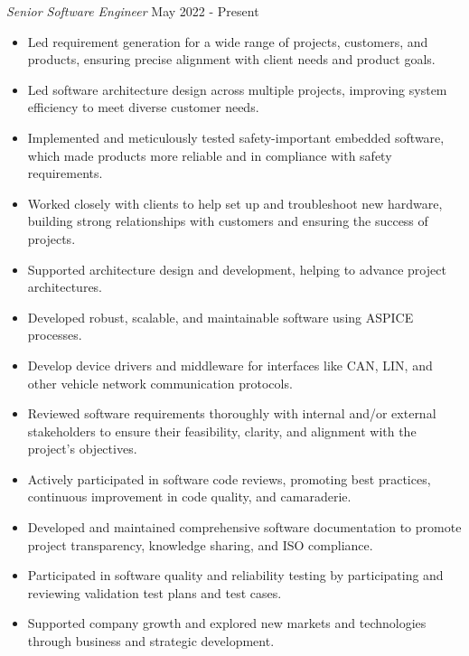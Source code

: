 \noindent
\textit{Senior Software Engineer} \hfill May 2022 - Present \\
\begin{itemize}[leftmargin=*,noitemsep,topsep=3pt]
    \item Led requirement generation for a wide range of projects, customers, and products, ensuring precise alignment with client needs and product goals.
    \item Led software architecture design across multiple projects, improving system efficiency to meet diverse customer needs.
    \item Implemented and meticulously tested safety-important embedded software, which made products more reliable and in compliance with safety requirements.
    \item Worked closely with clients to help set up and troubleshoot new hardware, building strong relationships with customers and ensuring the success of projects.
    \item Supported architecture design and development, helping to advance project architectures.
    \item Developed robust, scalable, and maintainable software using ASPICE processes.
    \item Develop device drivers and middleware for interfaces like CAN, LIN, and other vehicle network communication protocols.
    \item Reviewed software requirements thoroughly with internal and/or external stakeholders to ensure their feasibility, clarity, and alignment with the project's objectives.
    \item Actively participated in software code reviews, promoting best practices, continuous improvement in code quality, and camaraderie.
    \item Developed and maintained comprehensive software documentation to promote project transparency, knowledge sharing, and ISO compliance.
    \item Participated in software quality and reliability testing by participating and reviewing validation test plans and test cases.
    \item Supported company growth and explored new markets and technologies through business and strategic development.
\end{itemize}